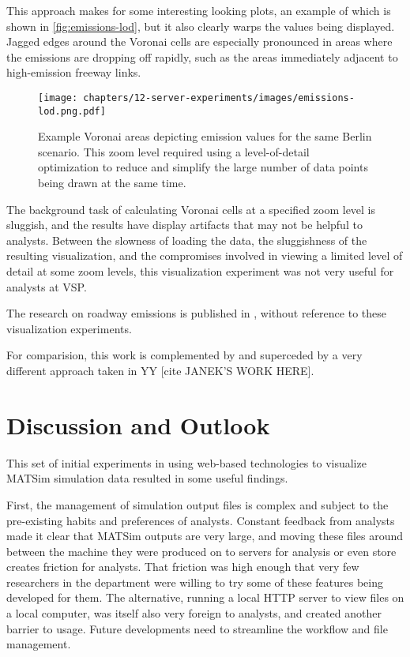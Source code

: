 This approach makes for some interesting looking plots, an example of which is shown in \autoref{fig:emissions-lod}, but it also clearly warps the values being displayed. Jagged edges around the Voronai cells are especially pronounced in areas where the emissions are dropping off rapidly, such as the areas immediately adjacent to high-emission freeway links.

\begin{figure}[!ht]
  \texttt{[image: chapters/12-server-experiments/images/emissions-lod.png.pdf]}
  \caption[Example Voronai areas depicting emission values for a Berlin scenario]{Example Voronai areas depicting emission values for the same Berlin scenario. This zoom level required using a level-of-detail optimization to reduce and simplify the large number of data points being drawn at the same time.}
  \label{fig:emissions-lod}
\end{figure}

The background task of calculating Voronai cells at a specified zoom level is sluggish, and the results have display artifacts that may not be helpful to analysts. Between the slowness of loading the data, the sluggishness of the resulting visualization, and the compromises involved in viewing a limited level of detail at some zoom levels, this visualization experiment was not very useful for analysts at VSP.

The research on roadway emissions is published in \cite{kaddoura2022exhaust}, without reference to these visualization experiments.

For comparision, this work is complemented by and superceded by a very different approach taken in YY [cite JANEK'S WORK HERE].

\hypertarget{server-experiments-findings}{%
\section{Discussion and Outlook}\label{server-experiments-findings}}

This set of initial experiments in using web-based technologies to visualize MATSim simulation data resulted in some useful findings.

First, the management of simulation output files is complex and subject to the pre-existing habits and preferences of analysts. Constant feedback from analysts made it clear that MATSim outputs are very large, and moving these files around between the machine they were produced on to servers for analysis or even store creates friction for analysts. That friction was high enough that very few researchers in the department were willing to try some of these features being developed for them. The alternative, running a local HTTP server to view files on a local computer, was itself also very foreign to analysts, and created another barrier to usage. Future developments need to streamline the workflow and file management.

